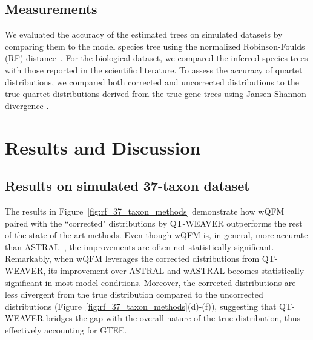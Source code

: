 \documentclass[runningheads]{llncs}
\begin{document}
\vspace{-10pt}
\subsection{Measurements}
\vspace{-3pt}
We evaluated the accuracy of the estimated trees on simulated datasets by comparing them to the model species tree using the normalized Robinson-Foulds (RF) distance~\cite{robinson_comparison_1981}. 
For the biological dataset, we compared the inferred species trees with those reported in the scientific literature. 
To assess the accuracy of quartet distributions, we compared both corrected and uncorrected distributions to the true quartet distributions derived from the true gene trees using Jansen-Shannon divergence \cite{fuglede2004jensen}.

\vspace{-10pt}
\section{Results and Discussion}
\vspace{-5pt}
\subsection{Results on simulated 37-taxon dataset}
\vspace{-5pt}
The results in Figure~\ref{fig:rf_37_taxon_methods} demonstrate how wQFM paired with the ``corrected" distributions by QT-WEAVER outperforms the rest of the state-of-the-art methods. Even though wQFM is, in general, more accurate than ASTRAL~\cite{wqfm,mahbub2022qt}, the improvements are often not statistically significant. Remarkably, when wQFM leverages the corrected distributions from QT-WEAVER, its improvement over ASTRAL and wASTRAL becomes statistically significant in most model conditions. Moreover, the corrected distributions are less divergent from the true distribution compared to the uncorrected distributions (Figure~\ref{fig:rf_37_taxon_methods}(d)-(f)), suggesting that QT-WEAVER bridges the gap with the overall nature of the true distribution, thus effectively accounting for GTEE.
\end{document}
